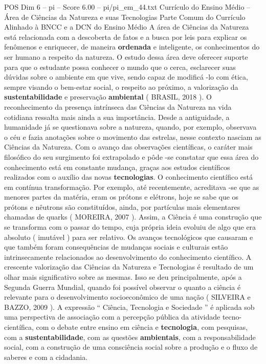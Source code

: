 \begin{textsample}{POS Dim 6 – pi – Score 6.00 – pi/pi\_em\_44.txt}  \label{ex:f6_pos_199}
Currículo do Ensino Médio – Área de Ciências da Natureza e suas Tecnologias Parte Comum do Currículo Alinhado à BNCC e a DCN do Ensino Médio A área de Ciências da Natureza está relacionada com a descoberta de fatos e a busca por leis para explicar os fenômenos e enriquecer, de maneira \textbf{ordenada} e inteligente, os conhecimentos do ser humano a respeito da natureza.
O estudo dessa área deve oferecer suporte para que o estudante possa conhecer o mundo que o cerca, esclarecer suas dúvidas sobre o ambiente em que vive, sendo capaz de modificá -lo com ética, sempre visando o bem-estar social, o respeito ao próximo, a valorização da \textbf{sustentabilidade} e preservação \textbf{ambiental} ( BRASIL, 2018 ).
O reconhecimento da presença intrínseca das Ciências da Natureza na vida cotidiana ressalta mais ainda a sua importância.
Desde a antiguidade, a humanidade já se questionava sobre a natureza, quando, por exemplo, observava o céu e fazia anotações sobre o movimento das estrelas, nesse contexto nasciam as Ciências da Natureza.
Com o avanço das observações científicas, o caráter mais filosófico do seu surgimento foi extrapolado e pôde -se constatar que essa área do conhecimento está em constante mudança, graças aos estudos científicos realizados com o auxílio das novas \textbf{tecnologias}.
O conhecimento científico está em contínua transformação.
Por exemplo, até recentemente, acreditava -se que as menores partes da matéria, eram os prótons e elétrons, hoje se sabe que os prótons e nêutrons são constituídos, ainda, por partículas mais elementares chamadas de quarks ( MOREIRA, 2007 ).
Assim, a Ciência é uma construção que se transforma com o passar do tempo, cuja própria ideia evoluiu de algo que era absoluto ( imutável ) para ser relativo.
Os avanços tecnológicos que causaram e que também foram consequências de mudanças sociais e culturais estão intrinsecamente relacionados ao desenvolvimento do conhecimento científico.
A crescente valorização das Ciências da Natureza e Tecnologias é resultado de um olhar mais significativo sobre as mesmas.
Isso se deu principalmente, após a Segunda Guerra Mundial, quando foi possível observar o quanto a ciência é relevante para o desenvolvimento socioeconômico de uma nação ( SILVEIRA e BAZZO, 2009 ).
A expressão “ Ciência, Tecnologia e Sociedade ” é aplicada sob uma perspectiva de associação com a percepção pública da atividade tecno-científica, com o debate entre ensino em ciência e \textbf{tecnologia}, com pesquisas, com a \textbf{sustentabilidade}, com as questões \textbf{ambientais}, com a responsabilidade social, com a construção de uma consciência social sobre a produção e o fluxo de saberes e com a cidadania.

\end{textsample}
